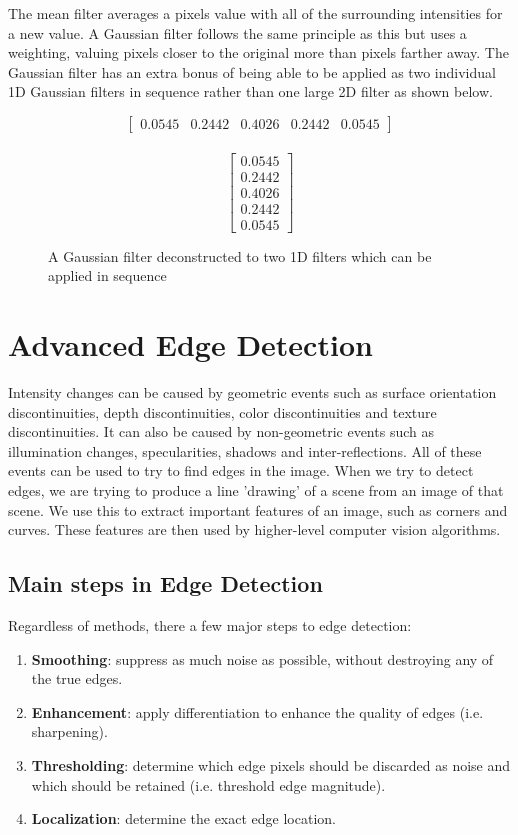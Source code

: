 \documentclass{article}
\begin{document}
	The mean filter averages a pixels value with all of the surrounding intensities for a new value. A Gaussian filter follows the same principle as this but uses a weighting, valuing pixels closer to the original more than pixels farther away.	The Gaussian filter has an extra bonus of being able to be applied as two individual 1D Gaussian filters in sequence rather than one large 2D filter as shown below.
	\begin{figure}[ht]
	\begin{multicols}{2}
		\[\begin{bmatrix} 0.0545 & 0.2442 & 0.4026 & 0.2442 & 0.0545 \end{bmatrix} \] \\
		\[\begin{bmatrix} 0.0545 \\ 0.2442 \\ 0.4026 \\ 0.2442 \\ 0.0545 \end{bmatrix} \]
	\end{multicols}
	\caption{A Gaussian filter deconstructed to two 1D filters which can be applied in sequence}
	\label{fig:1d gaussian filter}
	\end{figure}
	
	\section{Advanced Edge Detection}
	Intensity changes can be caused by geometric events such as surface orientation discontinuities, depth discontinuities, color discontinuities and texture discontinuities. It can also be caused by non-geometric events such as illumination changes, specularities, shadows and inter-reflections. All of these events can be used to try to find edges in the image. When we try to detect edges, we are trying to produce a line 'drawing' of a scene from an image of that scene. We use this to extract important features of an image, such as corners and curves. These features are then used by higher-level computer vision algorithms.
	
	\subsection{Main steps in Edge Detection}
	Regardless of methods, there a few major steps to edge detection:
		\begin{enumerate}
			\item \textbf{Smoothing}: suppress as much noise as possible, without destroying any of the true edges.
			\item \textbf{Enhancement}: apply differentiation to enhance the quality of edges (i.e. sharpening).
			\item \textbf{Thresholding}: determine which edge pixels should be discarded as  noise and which should be retained (i.e. threshold edge magnitude).
			
			\item \textbf{Localization}: determine the exact edge location.
		\end{enumerate}
\end{document}
